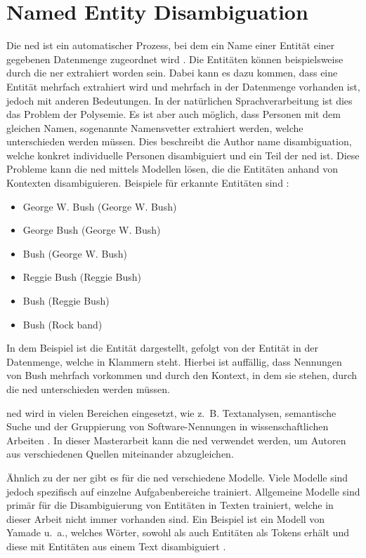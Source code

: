 \section{Named Entity Disambiguation}
\label{sec:author-name-disambiguation}
Die \gls{ned} ist ein automatischer Prozess, bei dem ein Name einer Entität einer gegebenen Datenmenge zugeordnet wird \autocites{cucerzan_large-scale_2007}{yamada_global_2022}.
Die Entitäten können beispielsweise durch die \gls{ner} extrahiert worden sein.
Dabei kann es dazu kommen, dass eine Entität mehrfach extrahiert wird und mehrfach in der Datenmenge vorhanden ist, jedoch mit anderen Bedeutungen.
In der natürlichen Sprachverarbeitung ist dies das Problem der Polysemie.
Es ist aber auch möglich, dass Personen mit dem gleichen Namen, sogenannte Namensvetter extrahiert werden, welche unterschieden werden müssen.
Dies beschreibt die Author name disambiguation, welche konkret individuelle Personen disambiguiert und ein Teil der \gls{ned} ist.
Diese Probleme kann die \gls{ned} mittels Modellen lösen, die die Entitäten anhand von Kontexten disambiguieren.
Beispiele für erkannte Entitäten sind \autocite{cucerzan_large-scale_2007}:

\begin{itemize}
  \item George W. Bush (George W. Bush)
  \item George Bush (George W. Bush)
  \item Bush (George W. Bush)
  \item Reggie Bush (Reggie Bush)
  \item Bush (Reggie Bush)
  \item Bush (Rock band)
\end{itemize}

In dem Beispiel ist die Entität dargestellt, gefolgt von der Entität in der Datenmenge, welche in Klammern steht.
Hierbei ist auffällig, dass Nennungen von \glqq Bush\grqq{} mehrfach vorkommen und durch den Kontext, in dem sie stehen, durch die \gls{ned} unterschieden werden müssen.

\gls{ned} wird in vielen Bereichen eingesetzt, wie z.~B. Textanalysen, semantische Suche und der Gruppierung von Software-Nennungen in wissenschaftlichen Arbeiten \autocites{cucerzan_large-scale_2007}{yamada_global_2022}{schindler_somesci-_2021}.
In dieser Masterarbeit kann die \gls{ned} verwendet werden, um Autoren aus verschiedenen Quellen miteinander abzugleichen.

Ähnlich zu der \gls{ner} gibt es für die \gls{ned} verschiedene Modelle.
Viele Modelle sind jedoch spezifisch auf einzelne Aufgabenbereiche trainiert.
Allgemeine Modelle sind primär für die Disambiguierung von Entitäten in Texten trainiert, welche in dieser Arbeit nicht immer vorhanden sind.
Ein Beispiel ist ein Modell von Yamade u.~a., welches Wörter, sowohl als auch Entitäten als Tokens erhält und diese mit Entitäten aus einem Text disambiguiert \autocite{yamada_global_2022}.
